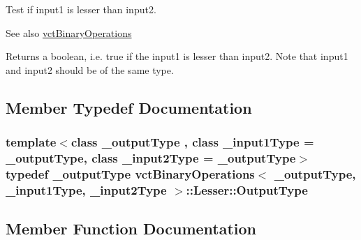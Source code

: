 Test if input1 is lesser than input2. 

\begin{DoxySeeAlso}{See also}
\hyperlink{classvct_binary_operations}{vct\+Binary\+Operations}
\end{DoxySeeAlso}
Returns a boolean, i.\+e. true if the input1 is lesser than input2. Note that input1 and input2 should be of the same type. 

\subsection{Member Typedef Documentation}
\hypertarget{classvct_binary_operations_1_1_lesser_a3f6be40aec12d4a06f0a16d729f765da}{}
\subsubsection[{Output\+Type}]{\setlength{\rightskip}{0pt plus 5cm}template$<$class \+\_\+output\+Type , class \+\_\+input1\+Type  = \+\_\+output\+Type, class \+\_\+input2\+Type  = \+\_\+output\+Type$>$ typedef \+\_\+output\+Type {\bf vct\+Binary\+Operations}$<$ \+\_\+output\+Type, \+\_\+input1\+Type, \+\_\+input2\+Type $>$\+::{\bf Lesser\+::\+Output\+Type}}\label{classvct_binary_operations_1_1_lesser_a3f6be40aec12d4a06f0a16d729f765da}


\subsection{Member Function Documentation}
\hypertarget{classvct_binary_operations_1_1_lesser_a6649ee7e25530348419b0de177084357}{}

